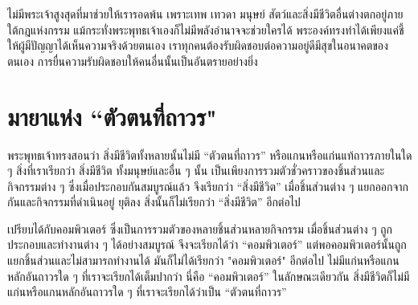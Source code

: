 \documentclass[12pt, openany]{book}
\begin{document}
ไม่{\wbr}มี{\wbr}พระเจ้า{\wbr}สูง{\wbr}สุด{\wbr}ที่{\wbr}มา{\wbr}ช่วย{\wbr}ให้{\wbr}เรา{\wbr}รอด{\wbr}พ้น เพราะ{\wbr}เทพ เทวดา มนุษย์ สัตว์{\wbr}และ{\wbr}สิ่ง{\wbr}มี{\wbr}ชีวิต{\wbr}อื่น{\wbr}ต่าง{\wbr}ตก{\wbr}อยู่{\wbr}ภาย{\wbr}ใต้{\wbr}กฎ{\wbr}แห่ง{\wbr}กรรม  แม้{\wbr}กระทั่ง{\wbr}พระพุทธเจ้า{\wbr}เอง{\wbr}ก็{\wbr}ไม่{\wbr}มี{\wbr}พลัง{\wbr}อำนาจ{\wbr}จะ{\wbr}ช่วย{\wbr}ใคร{\wbr}ได้ พระองค์{\wbr}ทรง{\wbr}ทำ{\wbr}ได้{\wbr}เพียง{\wbr}แค่{\wbr}ชี้{\wbr}ให้{\wbr}ผู้{\wbr}มี{\wbr}ปัญญา{\wbr}ได้{\wbr}เห็น{\wbr}ความ{\wbr}จริง{\wbr}ด้วย{\wbr}ตนเอง  เรา{\wbr}ทุก{\wbr}คน{\wbr}ต้อง{\wbr}รับผิดชอบ{\wbr}ต่อ{\wbr}ความ{\wbr}อยู่{\wbr}ดี{\wbr}มี{\wbr}สุข{\wbr}ใน{\wbr}อนาคต{\wbr}ของ{\wbr}ตนเอง  การ{\wbr}ยื่น{\wbr}ความ{\wbr}รับผิดชอบ{\wbr}ให้{\wbr}คน{\wbr}อื่น{\wbr}นั้น{\wbr}เป็น{\wbr}อันตราย{\wbr}อย่าง{\wbr}ยิ่ง{\wbr}

\section{มายาแห่ง ``ตัวตนที่ถาวร"}


พระพุทธเจ้า{\wbr}ทรง{\wbr}สอน{\wbr}ว่า สิ่ง{\wbr}มี{\wbr}ชีวิต{\wbr}ทั้งหลาย{\wbr}นั้น{\wbr}ไม่{\wbr}มี “ตัวตน{\wbr}ที่{\wbr}ถาวร” หรือ{\wbr}แกน{\wbr}หรือ{\wbr}แก่น{\wbr}แท้{\wbr}ถาวร{\wbr}ภายใน{\wbr}ใด ๆ  สิ่ง{\wbr}ที่{\wbr}เรา{\wbr}เรียก{\wbr}ว่า สิ่ง{\wbr}มี{\wbr}ชีวิต ทั้ง{\wbr}มนุษย์{\wbr}และ{\wbr}อื่น ๆ นั้น เป็น{\wbr}เพียง{\wbr}การ{\wbr}รวม{\wbr}ตัว{\wbr}ชั่วคราว{\wbr}ของ{\wbr}ชิ้น{\wbr}ส่วน{\wbr}และ{\wbr}กิจกรรม{\wbr}ต่าง ๆ ซึ่ง{\wbr}เมื่อ{\wbr}ประกอบ{\wbr}กัน{\wbr}สมบูรณ์{\wbr}แล้ว จึง{\wbr}เรียก{\wbr}ว่า “สิ่ง{\wbr}มี{\wbr}ชีวิต”  เมื่อ{\wbr}ชิ้น{\wbr}ส่วน{\wbr}ต่าง ๆ แยก{\wbr}ออก{\wbr}จาก{\wbr}กัน{\wbr}และ{\wbr}กิจกรรม{\wbr}ที่{\wbr}ดำเนิน{\wbr}อยู่ ยุติ{\wbr}ลง สิ่ง{\wbr}นั้น{\wbr}ก็{\wbr}ไม่{\wbr}เรียก{\wbr}ว่า “สิ่ง{\wbr}มี{\wbr}ชีวิต” อีก{\wbr}ต่อ{\wbr}ไป    

เปรียบ{\wbr}ได้{\wbr}กับ{\wbr}คอมพิวเตอร์ ซึ่ง{\wbr}เป็น{\wbr}การ{\wbr}รวม{\wbr}ตัว{\wbr}ของ{\wbr}หลาย{\wbr}ชิ้น{\wbr}ส่วน{\wbr}หลาย{\wbr}กิจกรรม เมื่อ{\wbr}ชิ้น{\wbr}ส่วน{\wbr}ต่าง ๆ ถูก{\wbr}ประกอบ{\wbr}และ{\wbr}ทำงาน{\wbr}ต่าง ๆ ได้{\wbr}อย่าง{\wbr}สมบูรณ์ จึง{\wbr}จะ{\wbr}เรียก{\wbr}ได้{\wbr}ว่า “คอมพิวเตอร์” แต่{\wbr}พอ{\wbr}คอมพิวเตอร์{\wbr}นั้น{\wbr}ถูก{\wbr}แยก{\wbr}ชิ้น{\wbr}ส่วน{\wbr}และ{\wbr}ไม่{\wbr}สามารถ{\wbr}ทำงาน{\wbr}ได้ มัน{\wbr}ก็{\wbr}ไม่{\wbr}ได้{\wbr}เรียก{\wbr}ว่า "คอมพิวเตอร์" อีก{\wbr}ต่อ{\wbr}ไป  ไม่{\wbr}มี{\wbr}แก่น{\wbr}หรือ{\wbr}แกน{\wbr}หลัก{\wbr}อัน{\wbr}ถาวร{\wbr}ใด ๆ ที่{\wbr}เรา{\wbr}จะ{\wbr}เรียก{\wbr}ได้{\wbr}เต็ม{\wbr}ปาก{\wbr}ว่า นี่{\wbr}คือ “คอมพิวเตอร์”  ใน{\wbr}ลักษณะ{\wbr}เดียวกัน สิ่ง{\wbr}มี{\wbr}ชีวิต{\wbr}ก็{\wbr}ไม่{\wbr}มี{\wbr}แก่น{\wbr}หรือ{\wbr}แกน{\wbr}หลัก{\wbr}อัน{\wbr}ถาวร{\wbr}ใด ๆ ที่{\wbr}เรา{\wbr}จะ{\wbr}เรียก{\wbr}ได้{\wbr}ว่า{\wbr}เป็น “ตัวตน{\wbr}ที่{\wbr}ถาวร”
\end{document}
